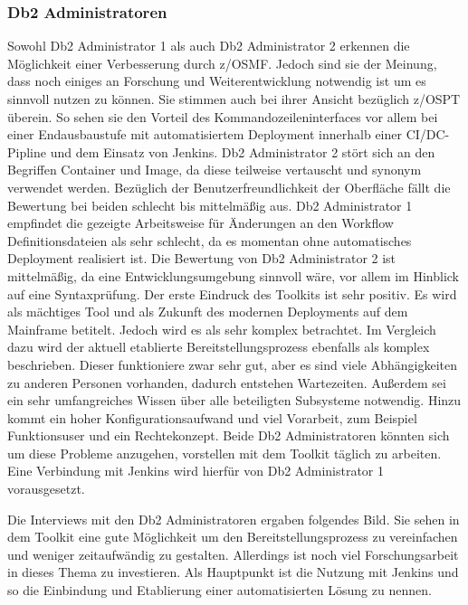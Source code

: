 \subsubsection{Db2 Administratoren}
Sowohl Db2 Administrator 1 als auch Db2 Administrator 2 erkennen die Möglichkeit einer Verbesserung durch z/OSMF.
Jedoch sind sie der Meinung, dass noch einiges an Forschung und Weiterentwicklung notwendig ist um es sinnvoll nutzen zu können.
Sie stimmen auch bei ihrer Ansicht bezüglich z/OSPT überein.
So sehen sie den Vorteil des Kommandozeileninterfaces vor allem bei einer Endausbaustufe mit automatisiertem Deployment innerhalb einer CI/DC-Pipline und dem Einsatz von Jenkins.
Db2 Administrator 2 stört sich an den Begriffen \glqq Container\grqq{} und \glqq Image\grqq, da diese teilweise vertauscht und synonym verwendet werden.
Bezüglich der Benutzerfreundlichkeit der Oberfläche fällt die Bewertung bei beiden schlecht bis mittelmäßig aus.
Db2 Administrator 1 empfindet die gezeigte Arbeitsweise für Änderungen an den Workflow Definitionsdateien als sehr schlecht, da es momentan ohne automatisches Deployment realisiert ist.
Die Bewertung von Db2 Administrator 2 ist mittelmäßig, da eine Entwicklungsumgebung sinnvoll wäre, vor allem im Hinblick auf eine Syntaxprüfung.
Der erste Eindruck des Toolkits ist sehr positiv.
Es wird als mächtiges Tool und als Zukunft des modernen Deployments auf dem Mainframe betitelt.
Jedoch wird es als sehr komplex betrachtet.
Im Vergleich dazu wird der aktuell etablierte Bereitstellungsprozess ebenfalls als komplex beschrieben.
Dieser funktioniere zwar sehr gut, aber es sind viele Abhängigkeiten zu anderen Personen vorhanden, dadurch entstehen Wartezeiten.
Außerdem sei ein sehr umfangreiches Wissen über alle beteiligten Subsysteme notwendig.
Hinzu kommt ein hoher Konfigurationsaufwand und viel Vorarbeit, zum Beispiel Funktionsuser und ein Rechtekonzept.
Beide Db2 Administratoren könnten sich um diese Probleme anzugehen, vorstellen mit dem Toolkit täglich zu arbeiten.
Eine Verbindung mit Jenkins wird hierfür von Db2 Administrator 1 vorausgesetzt.

Die Interviews mit den Db2 Administratoren ergaben folgendes Bild.
Sie sehen in dem Toolkit eine gute Möglichkeit um den Bereitstellungsprozess zu vereinfachen und weniger zeitaufwändig zu gestalten.
Allerdings ist noch viel Forschungsarbeit in dieses Thema zu investieren.
Als Hauptpunkt ist die Nutzung mit Jenkins und so die Einbindung und Etablierung einer automatisierten Lösung zu nennen.

